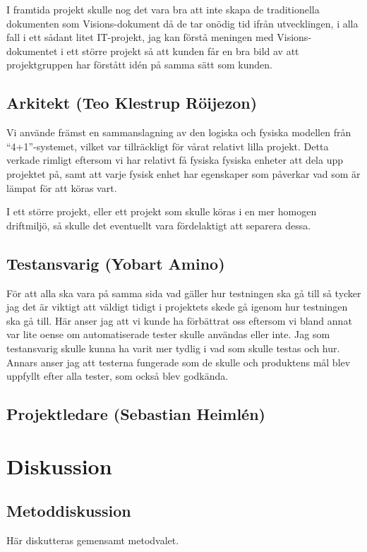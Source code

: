 \documentclass[conference,a4paper]{IEEEtran}
\begin{document}
I framtida projekt skulle nog det vara bra att inte skapa de traditionella dokumenten som Visions-dokument då de tar onödig tid ifrån utvecklingen, i alla fall i ett sådant litet IT-projekt, jag kan förstå meningen med Visions-dokumentet i ett större projekt så att kunden får en bra bild av att projektgruppen har förstått idén på samma sätt som kunden.

\subsection{Arkitekt (Teo Klestrup Röijezon)}
Vi använde främst en sammanslagning av den logiska och fysiska modellen från ``4+1''-systemet\cite{Kruchten95}, vilket var tillräckligt för vårat relativt lilla projekt. Detta verkade rimligt eftersom vi har relativt få fysiska fysiska enheter att dela upp projektet på, samt att varje fysisk enhet har egenskaper som påverkar vad som är lämpat för att köras vart.

I ett större projekt, eller ett projekt som skulle köras i en mer homogen driftmiljö, så skulle det eventuellt vara fördelaktigt att separera dessa.

\subsection{Testansvarig (Yobart Amino)}
För att alla ska vara på samma sida vad gäller hur testningen ska gå till så tycker jag det är viktigt att väldigt tidigt i projektets skede gå igenom hur testningen ska gå till. Här anser jag att vi kunde ha förbättrat oss eftersom vi bland annat var lite oense om automatiserade tester skulle användas eller inte. Jag som testansvarig skulle kunna ha varit mer tydlig i vad som skulle testas och hur. 
Annars anser jag att testerna fungerade som de skulle och produktens mål blev uppfyllt efter alla tester, som också blev godkända.

\subsection{Projektledare (Sebastian Heimlén)}

\section{Diskussion} \label{sec:disk}

\subsection{Metoddiskussion}
Här diskutteras gemensamt metodvalet.
\end{document}
